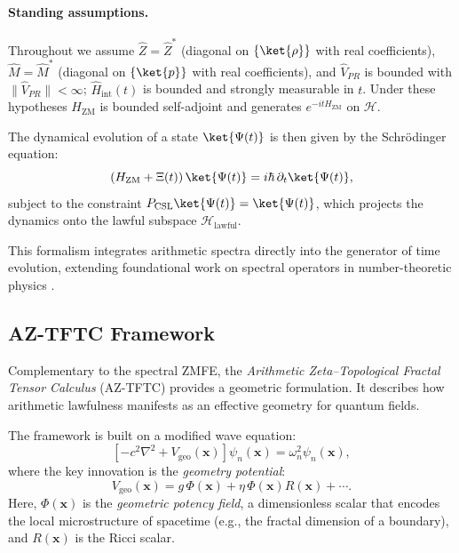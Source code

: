 \documentclass[12]{amsart}
\theoremstyle{plain}
\begin{document}
\paragraph{Standing assumptions.}
Throughout we assume $\widehat Z=\widehat Z^\ast$ (diagonal on $\{\ket{\rho}\}$ with real coefficients),
$\widehat M=\widehat M^\ast$ (diagonal on $\{\ket{p}\}$ with real coefficients), and $\widehat V_{PR}$ is bounded
with $\|\widehat V_{PR}\|<\infty$; $\widehat H_{\mathrm{int}}(t)$ is bounded and strongly measurable in $t$.
Under these hypotheses $H_{\mathrm{ZM}}$ is bounded self-adjoint and generates $e^{-itH_{\mathrm{ZM}}}$ on $\mathcal H$.

The dynamical evolution of a state $\ket{\Psi(t)}$ is then given by the Schrödinger equation:
\begin{equation}\label{eq:ZMFE}
    \left( H_{\mathrm{ZM}} + \Xi(t) \right) \ket{\Psi(t)} = i\hbar \, \partial_t \ket{\Psi(t)},
\end{equation}
subject to the constraint $P_{\mathrm{CSL}} \ket{\Psi(t)} = \ket{\Psi(t)}$, which projects the dynamics onto the lawful subspace $\mathcal{H}_{\mathrm{lawful}}$.

This formalism integrates arithmetic spectra directly into the generator of time evolution, extending foundational work on spectral operators in number-theoretic physics \cite{Connes1999, BostConnes1995}.

\subsection{AZ-TFTC Framework}

Complementary to the spectral ZMFE, the \emph{Arithmetic Zeta--Topological Fractal Tensor Calculus} (AZ-TFTC) provides a geometric formulation. It describes how arithmetic lawfulness manifests as an effective geometry for quantum fields.

The framework is built on a modified wave equation:
\begin{equation}\label{eq:AZTFTCEigenproblem}
    \left[ -c^2 \nabla^2 + V_{\mathrm{geo}}(\mathbf{x}) \right] \psi_n(\mathbf{x}) = \omega_n^2 \psi_n(\mathbf{x}),
\end{equation}
where the key innovation is the \emph{geometry potential}:
\begin{equation}\label{eq:GeoPotential}
    V_{\mathrm{geo}}(\mathbf{x}) = g \, \Phi(\mathbf{x}) + \eta \, \Phi(\mathbf{x}) R(\mathbf{x}) + \cdots.
\end{equation}
Here, $\Phi(\mathbf{x})$ is the \emph{geometric potency field}, a dimensionless scalar that encodes the local microstructure of spacetime (e.g., the fractal dimension of a boundary), and $R(\mathbf{x})$ is the Ricci scalar.
\end{document}

